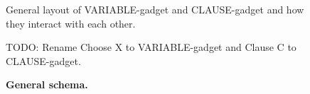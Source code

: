 \begin{figure}
\centering
\begin{tikzpicture}
\end{tikzpicture}
\caption{\textbf{General schema.}}
General layout of VARIABLE-gadget and CLAUSE-gadget and how they
interact with each other.

TODO: Rename Choose X to VARIABLE-gadget and Clause C to CLAUSE-gadget.
\label{fig:segment_apx_whole}
\end{figure}
